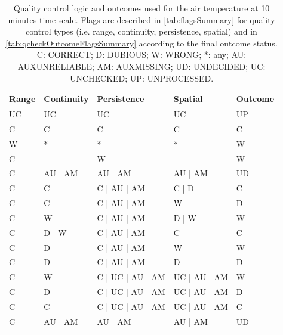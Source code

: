 \documentclass[authoryear,preprint,review,12pt]{elsarticle}
\begin{document}
\begin{table}[]
    \begin{scriptsize}
    \centering
    \begin{tabular}{lllll}
        \hline
        Range & Continuity & Persistence & Spatial & Outcome \\
        \hline
        UC & UC & UC & UC & UP \\
        C & C & C & C & C \\
        W & * & * & * & W \\
        C & – & W & – & W \\
        C & AU | AM & AU | AM & AU | AM & UD \\
        C & C & C | AU | AM & C | D & C \\
        C & C & C | AU | AM & W & D \\
        C & W & C | AU | AM & D | W & W \\
        C & D | W & C | AU | AM & C & C \\
        C & D & C | AU | AM & W & W \\
        C & D & C | AU | AM & D & D \\
        C & W & C | UC | AU | AM & UC | AU | AM & W \\
        C & D & C | UC | AU | AM & UC | AU | AM & D \\
        C & C & C | UC | AU | AM & UC | AU | AM & C \\
        C & AU | AM & AU | AM & AU | AM & UD \\
        \hline
    \end{tabular}
    \end{scriptsize}
    \caption{Quality control logic and outcomes used for the air temperature at 10 minutes time scale.
    Flags are described in \cref{tab:flagsSummary} for quality control types (i.e. range, continuity, persistence, spatial) and in \cref{tab:qcheckOutcomeFlagsSummary} according to the final outcome status.
    \scriptsize{C: CORRECT; D: DUBIOUS; W: WRONG; *: any; AU: AUXUNRELIABLE; AM: AUXMISSING; UD: UNDECIDED; UC: UNCHECKED; UP: UNPROCESSED.}}
    \label{tab:qcheck_m10_airT}
\end{table}
\end{document}
